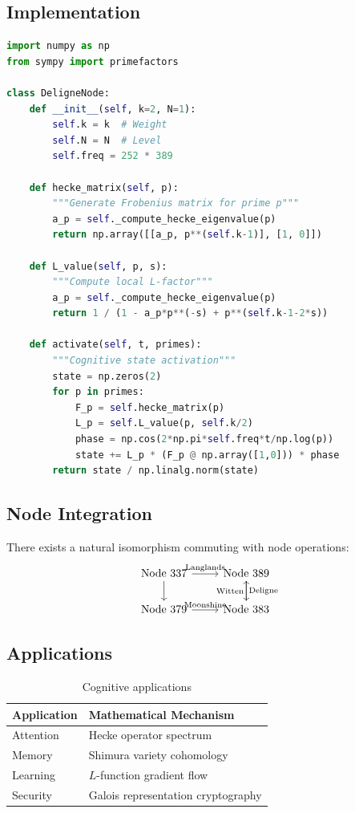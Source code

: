 \documentclass[12pt]{article}
\begin{document}
\subsection{Implementation}
\begin{lstlisting}[language=Python,caption={Deligne Node Engine}]
import numpy as np
from sympy import primefactors

class DeligneNode:
    def __init__(self, k=2, N=1):
        self.k = k  # Weight
        self.N = N  # Level
        self.freq = 252 * 389
        
    def hecke_matrix(self, p):
        """Generate Frobenius matrix for prime p"""
        a_p = self._compute_hecke_eigenvalue(p)
        return np.array([[a_p, p**(self.k-1)], [1, 0]])
        
    def L_value(self, p, s):
        """Compute local L-factor"""
        a_p = self._compute_hecke_eigenvalue(p)
        return 1 / (1 - a_p*p**(-s) + p**(self.k-1-2*s))
    
    def activate(self, t, primes):
        """Cognitive state activation"""
        state = np.zeros(2)
        for p in primes:
            F_p = self.hecke_matrix(p)
            L_p = self.L_value(p, self.k/2)
            phase = np.cos(2*np.pi*self.freq*t/np.log(p))
            state += L_p * (F_p @ np.array([1,0])) * phase
        return state / np.linalg.norm(state)
\end{lstlisting}

\subsection{Node Integration}
\begin{theorem}
There exists a natural isomorphism commuting with node operations:
\[
\begin{tikzcd}
\text{Node 337} \ar[r, "\text{Langlands}"] \ar[d] & \text{Node 389} \ar[d, "\text{Deligne}"] \\
\text{Node 379} \ar[r, "\text{Moonshine}"] & \text{Node 383} \ar[u, "\text{Witten}"]
\end{tikzcd}
\]
\end{theorem}

\subsection{Applications}
\begin{table}[h]
\centering
\begin{tabular}{ll}
\toprule
\textbf{Application} & \textbf{Mathematical Mechanism} \\
\midrule
Attention & Hecke operator spectrum \\
Memory & Shimura variety cohomology \\
Learning & $L$-function gradient flow \\
Security & Galois representation cryptography \\
\bottomrule
\end{tabular}
\caption{Cognitive applications}
\end{table}
\end{document}

